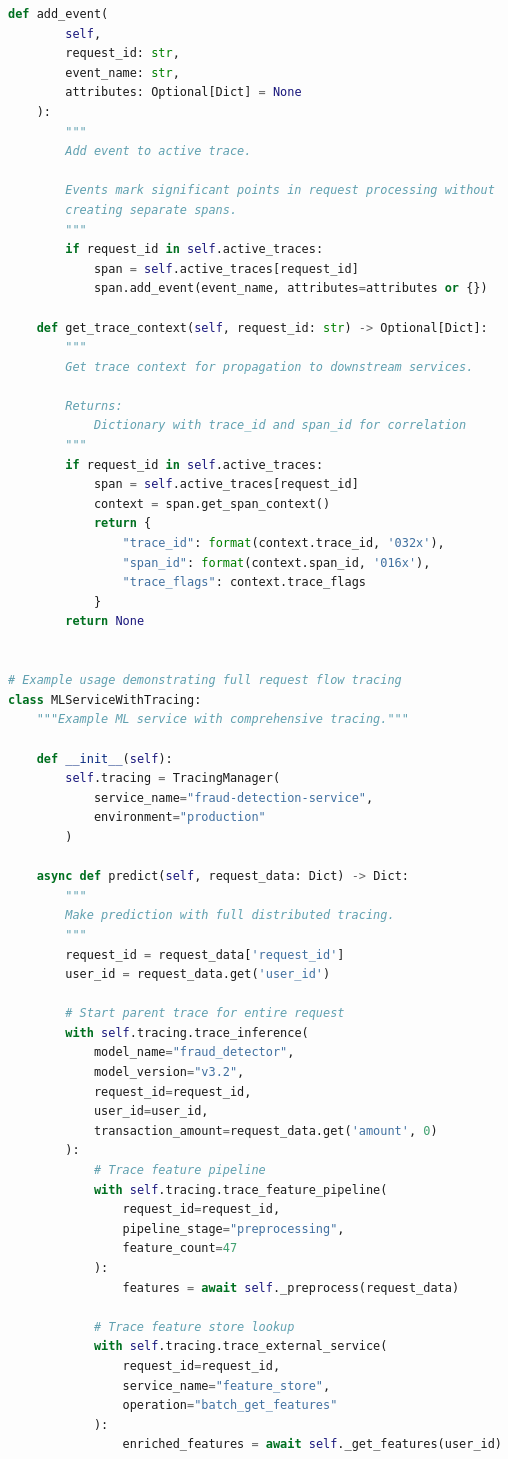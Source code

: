 \begin{lstlisting}[language=Python, caption={Production TracingManager with OpenTelemetry}]
    def add_event(
        self,
        request_id: str,
        event_name: str,
        attributes: Optional[Dict] = None
    ):
        """
        Add event to active trace.

        Events mark significant points in request processing without
        creating separate spans.
        """
        if request_id in self.active_traces:
            span = self.active_traces[request_id]
            span.add_event(event_name, attributes=attributes or {})

    def get_trace_context(self, request_id: str) -> Optional[Dict]:
        """
        Get trace context for propagation to downstream services.

        Returns:
            Dictionary with trace_id and span_id for correlation
        """
        if request_id in self.active_traces:
            span = self.active_traces[request_id]
            context = span.get_span_context()
            return {
                "trace_id": format(context.trace_id, '032x'),
                "span_id": format(context.span_id, '016x'),
                "trace_flags": context.trace_flags
            }
        return None


# Example usage demonstrating full request flow tracing
class MLServiceWithTracing:
    """Example ML service with comprehensive tracing."""

    def __init__(self):
        self.tracing = TracingManager(
            service_name="fraud-detection-service",
            environment="production"
        )

    async def predict(self, request_data: Dict) -> Dict:
        """
        Make prediction with full distributed tracing.
        """
        request_id = request_data['request_id']
        user_id = request_data.get('user_id')

        # Start parent trace for entire request
        with self.tracing.trace_inference(
            model_name="fraud_detector",
            model_version="v3.2",
            request_id=request_id,
            user_id=user_id,
            transaction_amount=request_data.get('amount', 0)
        ):
            # Trace feature pipeline
            with self.tracing.trace_feature_pipeline(
                request_id=request_id,
                pipeline_stage="preprocessing",
                feature_count=47
            ):
                features = await self._preprocess(request_data)

            # Trace feature store lookup
            with self.tracing.trace_external_service(
                request_id=request_id,
                service_name="feature_store",
                operation="batch_get_features"
            ):
                enriched_features = await self._get_features(user_id)


\end{lstlisting}
